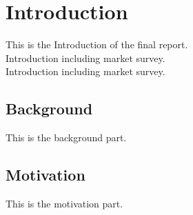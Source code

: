 \section{Introduction} 
This is the Introduction of the final report.\cite{Benner} \\
Introduction including market survey.\\
Introduction including market survey.\\
\subsection{Background}
This is the background part.
\subsection{Motivation}
This is the motivation part.

\newpage
